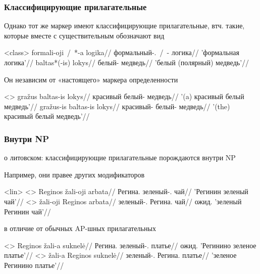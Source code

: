 \documentclass[9pt, t]{beamer}
\begin{document}
\begin{frame}
    \frametitle{Классифицирующие прилагательные}

    Однако тот же маркер имеют классифицирующие прилагательные, втч. такие, которые вместе с существительным обозначают вид \citep{rutpro2006}

    \pex<class>
        \a \begingl
            \gla formali-oji\ /\ *-a logika//
            \glb формальный-\Def{}.\F{}\ /\ -\F{} логика//
            \glft 'формальная логика'//
        \endgl
        \a \begingl
            \gla baltas*(-is) lokys//
            \glb белый-\Def{} медведь//
            \glft 'белый (полярный) медведь'//
        \endgl
    \xe
    
    \pause    
    Он независим от «настоящего» маркера определенности
    
    \pex<>
        \a \begingl
            \gla gražus baltas-is lokys//
            \glb красивый белый-\Def{} медведь//
            \glft '(a) красивый белый медведь'//
        \endgl
        \a \begingl
            \gla gražus-is baltas-is lokys//
            \glb красивый-\Def{} белый-\Def{} медведь//
            \glft '(the) красивый белый медведь'//
        \endgl
    \xe

\end{frame}


\begin{frame}
    \frametitle{Внутри NP}

    \citep{rutpro2006} о литовском: классифицирующие прилагательные порождаются внутри NP

    Например, они правее других модификаторов

    \pex<lin>
        \a<> \begingl
            \gla Reginos žali-oji arbata//
            \glb Регина.\Gen{} зеленый-\Def{}.\F{} чай//
            \glft 'Регинин зеленый чай'//
        \endgl
        \a<> \begingl
            \gla \ljudge{$^{\#}$}žali-oji Reginos arbata//
            \glb зеленый-\Def.\F{} Регина.\Gen{} чай//
            \glft ожид. 'зеленый Регинин чай'//
        \endgl
    \xe

    в отличие от обычных AP-шных прилагательных

    \pex
        \a<> \begingl
            \gla \ljudge{$^{\#}$}Reginos žali-a suknelė//
            \glb Регина.\Gen{} зеленый-\Def{}.\F{} платье//
            \glft ожид. 'Регинино зеленое платье'//
        \endgl
        \a<> \begingl
            \gla žali-a Reginos suknelė//
            \glb зеленый-\Def.\F{} Регина.\Gen{} платье//
            \glft 'зеленое Регинино платье'//
        \endgl
    \xe
    
\end{frame}
\end{document}

